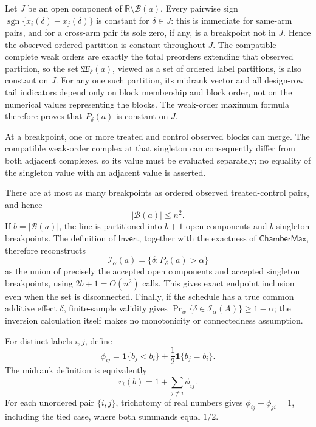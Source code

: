 Let \(J\) be an open component of \(\mathbb R\setminus\mathcal B(a)\).  Every pairwise sign \(\operatorname{sgn}\{x_i(\delta)-x_j(\delta)\}\) is constant for \(\delta\in J\): this is immediate for same-arm pairs, and for a cross-arm pair its sole zero, if any, is a breakpoint not in \(J\).  Hence the observed ordered partition is constant throughout \(J\).  The compatible complete weak orders are exactly the total preorders extending that observed partition, so the set \(\mathfrak W_\delta(a)\), viewed as a set of ordered label partitions, is also constant on \(J\).  For any one such partition, its midrank vector and all design-row tail indicators depend only on block membership and block order, not on the numerical values representing the blocks.  The weak-order maximum formula therefore proves that \(P_\delta(a)\) is constant on \(J\).

At a breakpoint, one or more treated and control observed blocks can merge.  The compatible weak-order complex at that singleton can consequently differ from both adjacent complexes, so its value must be evaluated separately; no equality of the singleton value with an adjacent value is asserted.

There are at most as many breakpoints as ordered observed treated-control pairs, and hence
\[
|\mathcal B(a)|\le n^2.
\]
If \(b=|\mathcal B(a)|\), the line is partitioned into \(b+1\) open components and \(b\) singleton breakpoints.  The definition of \(\mathsf{Invert}\), together with the exactness of \(\mathsf{ChamberMax}\), therefore reconstructs
\[
\mathcal I_\alpha(a)=\{\delta:P_\delta(a)>\alpha\}
\]
as the union of precisely the accepted open components and accepted singleton breakpoints, using \(2b+1=O(n^2)\) calls.  This gives exact endpoint inclusion even when the set is disconnected.  Finally, if the schedule has a true common additive effect \(\delta\), finite-sample validity gives
\(\Pr_w\{\delta\in\mathcal I_\alpha(A)\}\ge1-\alpha\); the inversion calculation itself makes no monotonicity or connectedness assumption.

For distinct labels \(i,j\), define
\[
\phi_{ij}=\mathbf 1\{b_j<b_i\}+\frac12\mathbf 1\{b_j=b_i\}.
\]
The midrank definition is equivalently
\[
r_i(b)=1+\sum_{j\ne i}\phi_{ij}.
\]
For each unordered pair \(\{i,j\}\), trichotomy of real numbers gives
\(\phi_{ij}+\phi_{ji}=1\), including the tied case, where both summands equal \(1/2\).

